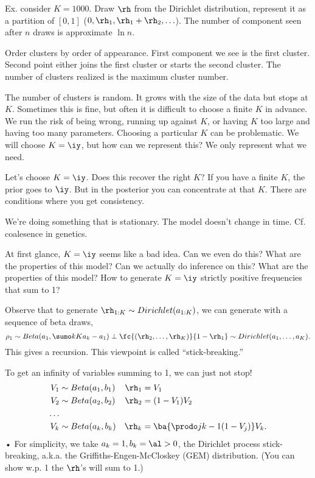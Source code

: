 Ex. consider $K=1000$. Draw $\rh$ from the Dirichlet distribution, represent it as a partition of $[0,1]$ ($0, \rh_1, \rh_1+\rh_2,\ldots$).
The number of component seen after $n$ draws is approximate $\ln n$.

Order clusters by order of appearance. First component we see is the first cluster.  Second point either joins the first cluster or starts the second cluster.
The number of clusters realized is the maximum cluster number.

The number of clusters is random. It grows with the size of the data but stops at $K$. Sometimes this is fine, but often it is difficult to choose a finite $K$ in advance. %
We run the risk of being wrong, running up against $K$, or having $K$ too large and having too many parameters.
Choosing a particular $K$ can be problematic. We will choose $K=\iy$, but how can we represent this? We only represent what we need. 

Let's choose $K=\iy$. Does this recover the right $K$? If you have a finite $K$, the prior goes to $\iy$. But in the posterior you can concentrate at that $K$. There are conditions where you get consistency.

We're doing something that is stationary. The model doesn't change in time. Cf. coalesence in genetics.

At first glance, $K=\iy$ seems like a bad idea. Can we even do this? What are the properties of this model? Can we actually do inference on this? What are the properties of this model? How to generate $K=\iy$ strictly positive frequencies that sum to 1? 

Observe that to generate $\rh_{1:K}\sim Dirichlet(a_{1:K})$, we can generate with a sequence of beta draws,
$$
\rho_1 \sim Beta(a_1,\sumo kK a_k -a_1) \perp 
\fc{(\rh_2,\ldots, \rh_K)}{1-\rh_1} \sim Dirichlet (a_1,\ldots, a_K).
$$
This gives a recursion. This viewpoint is called ``stick-breaking.''

To get an infinity of variables summing to 1, we can just not stop!
\begin{align}
V_1&\sim Beta(a_1,b_1)& \rh_1&=V_1\\
V_2&\sim Beta(a_2,b_2)& \rh_2&=(1-V_1)V_2\\
\ldots\\
V_k &\sim Beta(a_k,b_k) & \rh_k &=\ba{ \prodo j{k-1}(1-V_j)}V_k.
\end{align}•
For simplicity, we take $a_k=1,b_k=\al>0$, the Dirichlet process stick-breaking, a.k.a. the Griffiths-Engen-McCloskey (GEM) distribution. (You can show w.p. 1 the $\rh$'s will sum to 1.)

